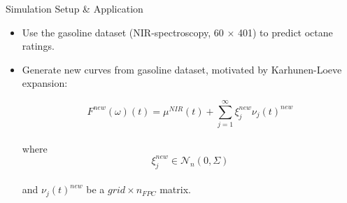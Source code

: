 \documentclass{beamer}
\begin{document}
	\begin{frame}{Simulation Setup \& Application}
		\begin{itemize}
		\item
		 Use the gasoline dataset (NIR-spectroscopy, 60 $\times$ 401) to predict octane ratings.
		\item 
		Generate new curves from gasoline dataset, motivated by Karhunen-Loeve expansion:
		
		$$F^{new}(\omega)(t) = \mu^{NIR}(t) + \sum_{j = 1}^{\infty} \xi_j^{new} \nu_j(t)^{new}$$ \\
		where \\
		 \vspace{0.1cm}
		$$\xi_{j}^{new} \in  \mathcal{N}_{n}(0,\Sigma)$$ \\
		and $\nu_j(t)^{new}$ be a $grid \times n_{FPC}$ matrix.
		
    		
		\end{itemize}
	\end{frame}
	
\end{document}
